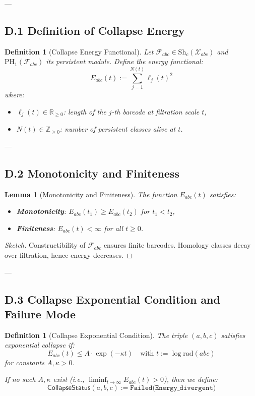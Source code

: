 \documentclass[11pt]{article}
\newtheorem{definition}[theorem]{Definition}
\newtheorem{lemma}[theorem]{Lemma}
\begin{document}
---

\subsection*{D.1 Definition of Collapse Energy}

\begin{definition}[Collapse Energy Functional]
Let \( \mathcal{F}_{abc} \in \mathrm{Sh}_c(\mathcal{X}_{abc}) \) and \( \mathrm{PH}_1(\mathcal{F}_{abc}) \) its persistent module.  
Define the energy functional:
\[
E_{abc}(t) := \sum_{j=1}^{N(t)} \ell_j(t)^2
\]
where:
\begin{itemize}
  \item \( \ell_j(t) \in \mathbb{R}_{\geq 0} \): length of the \( j \)-th barcode at filtration scale \( t \),
  \item \( N(t) \in \mathbb{Z}_{\geq 0} \): number of persistent classes alive at \( t \).
\end{itemize}
\end{definition}

---

\subsection*{D.2 Monotonicity and Finiteness}

\begin{lemma}[Monotonicity and Finiteness]
The function \( E_{abc}(t) \) satisfies:
\begin{itemize}
  \item \textbf{Monotonicity}: \( E_{abc}(t_1) \geq E_{abc}(t_2) \) for \( t_1 < t_2 \),
  \item \textbf{Finiteness}: \( E_{abc}(t) < \infty \) for all \( t \geq 0 \).
\end{itemize}
\end{lemma}

\begin{proof}[Sketch]
Constructibility of \( \mathcal{F}_{abc} \) ensures finite barcodes.  
Homology classes decay over filtration, hence energy decreases.
\end{proof}

---

\subsection*{D.3 Collapse Exponential Condition and Failure Mode}

\begin{definition}[Collapse Exponential Condition]
The triple \( (a,b,c) \) satisfies exponential collapse if:
\[
E_{abc}(t) \leq A \cdot \exp(-\kappa t)
\quad \text{with } t := \log \mathrm{rad}(abc)
\]
for constants \( A, \kappa > 0 \).

\medskip
If no such \( A, \kappa \) exist (i.e., \( \liminf_{t \to \infty} E_{abc}(t) > 0 \)), then we define:
\[
\mathsf{CollapseStatus}(a,b,c) := \texttt{Failed(Energy\_divergent)}
\]
\end{definition}
\end{document}
